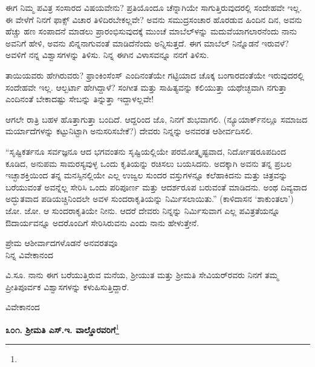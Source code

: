 ಈಗ ನಿಮ್ಮ ಪವಿತ್ರ ಸಂಸಾರದ ವಿಷಯವೇನು? ಪ್ರತಿಯೊಂದೂ ಚೆನ್ನಾಗಿಯೇ ಸಾಗುತ್ತಿರುವುದರಲ್ಲಿ ಸಂದೇಹವೇ ಇಲ್ಲ. ಈ ವೇಳೆಗೆ ನಿನಗೆ ಫಾಕ್ಸ್ ವಿಚಾರ ತಿಳಿದಿರಬೇಕಲ್ಲವೇ? ಅವನು ಸಮುದ್ರಸಂಚಾರ ಹೊರಡುವ ಹಿಂದಿನ ದಿನ, ಅವನು ಹೆಚ್ಚು ಹಣ ಸಂಪಾದನೆ ಮಾಡಲು ಪ್ರಾರಂಭಿಸುವುದಕ್ಕೆ ಮುಂಚೆ ಮಾಬೆಲ್‌ಳನ್ನು ಮದುವೆಯಾಗಲಾರನೆಂದು ನಾನು ಅವನಿಗೆ ಹೇಳಿ, ಅವನು ಖಿನ್ನನಾಗುವಂತೆ ಮಾಡಿದೆನೆಂದು ಅನ್ನಿಸುತ್ತದೆ. ಈಗ ಮಾಬೆಲ್ ನಿನ್ನೊಡನೆ ಇರುವಳೆ? ಅವಳಿಗೆ ನನ್ನ ವಿಶ್ವಾಸಗಳನ್ನು ತಿಳಿಸು. ನಿನ್ನ ಈಗಿನ ವಿಳಾಸವನ್ನೂ ನನಗೆ ತಿಳಿಸು.
\vspace{0.2cm}

ತಾಯಿಯವರು ಹೇಗಿರುವರು? ಫ್ರಾಂಕಿಂಸೆಂಸ್ ಎಂದಿನಂತೆಯೇ ಗಟ್ಟಿಯಾದ ಚೊಕ್ಕ ಬಂಗಾರದಂತೆಯೇ ಇರುವುದರಲ್ಲಿ ಸಂದೇಹವೇ ಇಲ್ಲ. ಆಲ್ಬರ್ಟಾ ಹೇಗಿದ್ದಾಳೆ? ಸಂಗೀತ ಮತ್ತು ಸಾಹಿತ್ಯವನ್ನು ಕಲಿಯುತ್ತಾ ಯಥೇಚ್ಛವಾಗಿ ನಗುತ್ತಾ ಎಂದಿನಂತೆ ಬೇಕಾದಷ್ಟು ಸೇಬನ್ನು ತಿನ್ನುತ್ತಾ ಇದ್ದಾಳಲ್ಲವೇ!
\vspace{0.2cm}

ಆಗಲೇ ರಾತ್ರಿ ಬಹಳ ಹೊತ್ತಾಗುತ್ತಾ ಬಂದಿದೆ. ಆದ್ದರಿಂದ ಜೊ, ನಿನಗೆ ಶುಭವಾಗಲಿ. (ನ್ಯೂಯಾರ್ಕ್‌ನಲ್ಲೂ ಸಮಾಜದ ಮರ್ಯಾದೆಗಳನ್ನು ಕಟ್ಟುನಿಟ್ಟಾಗಿ ಅನುಸರಿಸಬೇಕೆ?) ದೇವರು ನಿನ್ನನ್ನು ಅನವರತ ಆಶೀರ್ವದಿಸಲಿ.
\vspace{0.2cm}

“ಸೃಷ್ಟಿಕರ್ತನೂ ಸರ್ವಜ್ಞನೂ ಆದ ಭಗವಂತನು ಸೃಷ್ಟಿಯಲ್ಲಿಯೇ ಪರಮೋತ್ಕೃಷ್ಟವಾದ, ನಿರ್ದೋಷರೂಪದಿಂದ ಕೂಡಿದ, ಅನುಪಮ ಸಾಮರಸ್ಯವುಳ್ಳ ಒಂದು ಕೃತಿಯನ್ನು ರಚಿಸಲು ಬಯಸಿದನು. ಅದಕ್ಕಾಗಿ ಅವನು ತನ್ನ ಪ್ರಬಲ ಇಚ್ಛಾಶಕ್ತಿಯಿಂದ ತನ್ನ ಮನಸ್ಸಿನಲ್ಲಿಯೇ ಎಲ್ಲ ಉಜ್ವಲ ಸುಂದರ ವಸ್ತುಗಳನ್ನೂ ಕಲೆಹಾಕಿದನು ಮತ್ತು ಚಿತ್ರವನ್ನು ಬರೆಯುವಂತೆ ಅವನ್ನೆಲ್ಲ ಸೇರಿಸಿ ಒಂದು ಪರಿಪೂರ್ಣ ಮತ್ತು ಆದರ್ಶರೂಪ ಬರುವಂತೆ ಮಾಡಿದನು. ಅಂಥ ದಿವ್ಯವಾದ ಅದ್ಭುತವಾದ ಪಡಿಯಚ್ಚಿನಿಂದಲೇ ಅವಳ ಸುಂದರಾಕೃತಿಯನ್ನು ನಿರ್ಮಿಸಲಾಯಿತು.” (ಕಾಳಿದಾಸನ ‘ಶಾಕುಂತಲಾ’) ಜೋ. ಜೋ. ಆ ಸುಂದರಾಕೃತಿಯೇ ನೀನು. ಆದರೆ ದೇವರು ನಿನ್ನನ್ನು ನಿರ್ಮಿಸುವಾಗ ಎಲ್ಲ ಪವಿತ್ರತೆಯನ್ನೂ ಔದಾರ್ಯವನ್ನೂ ಅದರೊಂದಿಗೆ ಸೇರಿಸಿರುವನು ಎಂದು ನಾನು ಹೇಳುತ್ತೇನೆ.
\vspace{-0.2cm}

\begin{flushright}
ಪ್ರೇಮ ಆಶೀರ್ವಾದಗಳೊಡನೆ ಅನವರತವೂ\\ನಿನ್ನ ವಿವೇಕಾನಂದ
\end{flushright}

ವಿ.ಸೂ.\enginline{-} ನಾನು ಈಗ ಬರೆಯುತ್ತಿರುವ ಮನೆಯ, ಶ‍್ರೀಯುತ ಮತ್ತು ಶ‍್ರೀಮತಿ ಸೇವಿಯರ್‌ರವರು ನಿನಗೆ ತಮ್ಮ ಪ್ರೀತಿಪೂರ್ವಕ ವಿಶ್ವಾಸಗಳನ್ನು ಕಳುಹಿಸುತ್ತಿದ್ದಾರೆ.
\vspace{-0.2cm}

{\flushright
ವಿವೇಕಾನಂದ\par}
\vspace{-0.2cm}

\begin{center}
\textbf{೩೦೧. ಶ‍್ರೀಮತಿ ಎಸ್.ಇ. ವಾಲ್ಡೊರವರಿಗೆ}\footnote{}
\end{center}
\vspace{-0.5cm}

